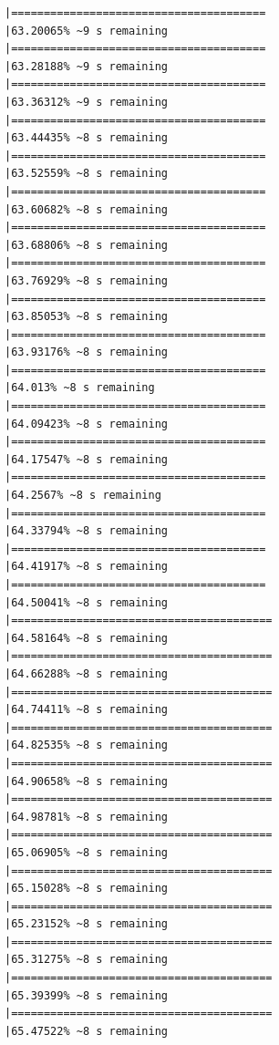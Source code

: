 \documentclass{article}\usepackage[]{graphicx}\usepackage[]{xcolor}
\makeatletter
\newenvironment{kframe}{%
 \def\at@end@of@kframe{}%
 \ifinner\ifhmode%
  \def\at@end@of@kframe{\end{minipage}}%
  \begin{minipage}{\columnwidth}%
 \fi\fi%
 \def\FrameCommand##1{\hskip\@totalleftmargin \hskip-\fboxsep
 \colorbox{shadecolor}{##1}\hskip-\fboxsep
     \hskip-\linewidth \hskip-\@totalleftmargin \hskip\columnwidth}%
 \MakeFramed {\advance\hsize-\width
   \@totalleftmargin\z@ \linewidth\hsize
   \@setminipage}}%
 {\par\unskip\endMakeFramed%
 \at@end@of@kframe}
\newenvironment{knitrout}{}{} %
\makeatother
\begin{document}
\begin{knitrout}
\begin{kframe}
\begin{verbatim}
|=======================================                       |63.20065% ~9 s remaining  
|=======================================                       |63.28188% ~9 s remaining  
|=======================================                       |63.36312% ~9 s remaining  
|=======================================                       |63.44435% ~8 s remaining  
|=======================================                       |63.52559% ~8 s remaining  
|=======================================                       |63.60682% ~8 s remaining  
|=======================================                       |63.68806% ~8 s remaining  
|=======================================                       |63.76929% ~8 s remaining  
|=======================================                       |63.85053% ~8 s remaining  
|=======================================                       |63.93176% ~8 s remaining  
|=======================================                       |64.013% ~8 s remaining    
|=======================================                       |64.09423% ~8 s remaining  
|=======================================                       |64.17547% ~8 s remaining  
|=======================================                       |64.2567% ~8 s remaining   
|=======================================                       |64.33794% ~8 s remaining  
|=======================================                       |64.41917% ~8 s remaining  
|=======================================                       |64.50041% ~8 s remaining  
|========================================                      |64.58164% ~8 s remaining  
|========================================                      |64.66288% ~8 s remaining  
|========================================                      |64.74411% ~8 s remaining  
|========================================                      |64.82535% ~8 s remaining  
|========================================                      |64.90658% ~8 s remaining  
|========================================                      |64.98781% ~8 s remaining  
|========================================                      |65.06905% ~8 s remaining  
|========================================                      |65.15028% ~8 s remaining  
|========================================                      |65.23152% ~8 s remaining  
|========================================                      |65.31275% ~8 s remaining  
|========================================                      |65.39399% ~8 s remaining  
|========================================                      |65.47522% ~8 s remaining  

\end{verbatim}
\end{kframe}
\end{knitrout}
\end{document}
